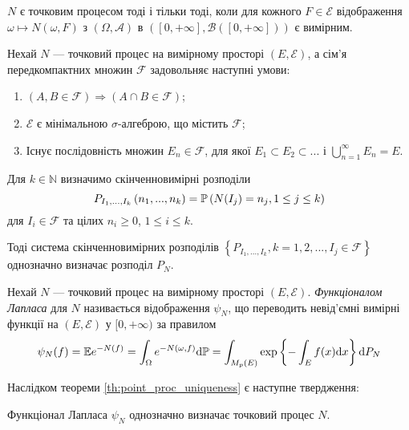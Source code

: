 \begin{theorem}
    $N$ є точковим процесом тоді і тільки тоді, коли для кожного
    $F \in \mathcal{E}$
    відображення $\omega \mapsto N(\omega, F)$
    з $\left(\Omega, \mathcal{A}\right)$
    в $\left([0, +\infty], \mathcal{B}([0, +\infty])\right)$
    є вимірним.
\end{theorem}
\begin{theorem}\label{th:point_proc_uniqueness}
    Нехай $N$ --- точковий процес на вимірному просторі
    $\left(E, \mathcal{E}\right)$, а сім'я передкомпактних множин $\mathcal{F}$
    задовольняє наступні умови:
    \begin{enumerate}
        \item $\left(A, B \in \mathcal{F}\right) \Rightarrow \left(A \cap B \in \mathcal{F}\right)$;
        \item $\mathcal{E}$ є мінімальною $\sigma$-алгеброю, що містить $\mathcal{F}$;
        \item Існує послідовність множин $E_n \in \mathcal{F}$, для якої
        $E_1 \subset E_2 \subset ...$ і $\bigcup_{n=1}^{\infty} E_n = E$.
    \end{enumerate}
    Для $k \in \mathbb{N}$ визначимо скінченновимірні розподіли
    $$
        P_{I_1,...,I_k} \left(n_1, ..., n_k\right) = 
        \P{N(I_j) = n_j, 1\leq j \leq k}
    $$
    для $I_i \in \mathcal{F}$ та цілих $n_i \geq 0$, $1 \leq i \leq k$.
    
    Тоді система скінченновимірних розподілів
    $\left\{P_{I_1,...,I_k}, k = 1,2,..., I_j \in \mathcal{F} \right\}$
    однозначно визначає розподіл $P_N$.
\end{theorem}

\begin{definition}
    Нехай $N$ --- точковий процес на вимірному просторі
    $\left(E, \mathcal{E}\right)$. \emph{Функціоналом Лапласа} для $N$
    називається відображення $\psi_N$, що переводить невід'ємні
    вимірні функції на $\left(E, \mathcal{E}\right)$ у $[0, +\infty)$
    за правилом
    \begin{gather}
        \psi_N(f) = \E e^{-N(f)} = \int_{\Omega} e^{-N(\omega, f)} \d \mathbb{P} = 
        \int_{M_p(E)} \exp\left\{ -\int_E f(x) \d x\right\} \d P_N
    \end{gather}
\end{definition}

Наслідком теореми \ref{th:point_proc_uniqueness} є наступне твердження:
\begin{theorem}
    Функціонал Лапласа $\psi_N$ однозначно визначає точковий процес $N$.
\end{theorem}

